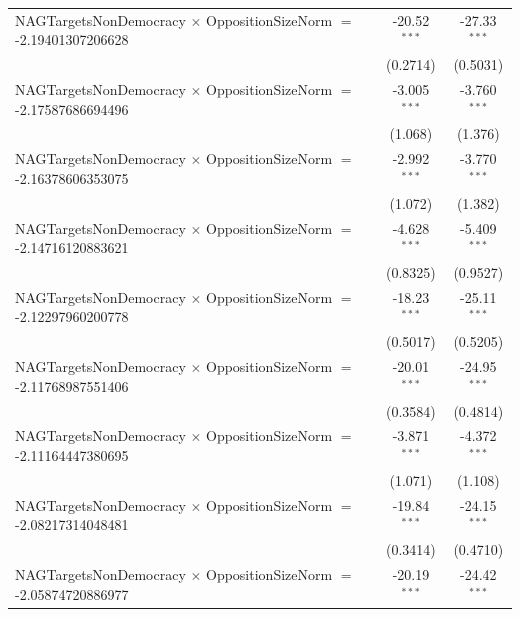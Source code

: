 \begin{tabular}{lcc}
   NAGTargetsNonDemocracy $\times$ OppositionSizeNorm $=$ -2.19401307206628     & -20.52$^{***}$       & -27.33$^{***}$\\   
                                                                                & (0.2714)             & (0.5031)\\   
   NAGTargetsNonDemocracy $\times$ OppositionSizeNorm $=$ -2.17587686694496     & -3.005$^{***}$       & -3.760$^{***}$\\   
                                                                                & (1.068)              & (1.376)\\   
   NAGTargetsNonDemocracy $\times$ OppositionSizeNorm $=$ -2.16378606353075     & -2.992$^{***}$       & -3.770$^{***}$\\   
                                                                                & (1.072)              & (1.382)\\   
   NAGTargetsNonDemocracy $\times$ OppositionSizeNorm $=$ -2.14716120883621     & -4.628$^{***}$       & -5.409$^{***}$\\   
                                                                                & (0.8325)             & (0.9527)\\   
   NAGTargetsNonDemocracy $\times$ OppositionSizeNorm $=$ -2.12297960200778     & -18.23$^{***}$       & -25.11$^{***}$\\   
                                                                                & (0.5017)             & (0.5205)\\   
   NAGTargetsNonDemocracy $\times$ OppositionSizeNorm $=$ -2.11768987551406     & -20.01$^{***}$       & -24.95$^{***}$\\   
                                                                                & (0.3584)             & (0.4814)\\   
   NAGTargetsNonDemocracy $\times$ OppositionSizeNorm $=$ -2.11164447380695     & -3.871$^{***}$       & -4.372$^{***}$\\   
                                                                                & (1.071)              & (1.108)\\   
   NAGTargetsNonDemocracy $\times$ OppositionSizeNorm $=$ -2.08217314048481     & -19.84$^{***}$       & -24.15$^{***}$\\   
                                                                                & (0.3414)             & (0.4710)\\   
   NAGTargetsNonDemocracy $\times$ OppositionSizeNorm $=$ -2.05874720886977     & -20.19$^{***}$       & -24.42$^{***}$\\   

\end{tabular}
